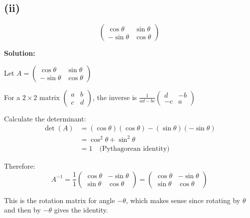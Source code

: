 \subsection*{(ii)}
\[
	\begin{pmatrix}
		\cos\theta  & \sin\theta \\
		-\sin\theta & \cos\theta
	\end{pmatrix}
\]

\textbf{Solution:}

Let $A = \begin{pmatrix}
		\cos\theta  & \sin\theta \\
		-\sin\theta & \cos\theta
	\end{pmatrix}$

For a $2 \times 2$ matrix $\begin{pmatrix} a & b \\ c & d \end{pmatrix}$, the inverse is $\frac{1}{ad-bc}\begin{pmatrix} d & -b \\ -c & a \end{pmatrix}$

Calculate the determinant:
\begin{align}
	\det(A) & = (\cos\theta)(\cos\theta) - (\sin\theta)(-\sin\theta) \\
	        & = \cos^2\theta + \sin^2\theta                          \\
	        & = 1 \quad \text{(Pythagorean identity)}
\end{align}

Therefore:
\[
	A^{-1} = \frac{1}{1}\begin{pmatrix}
		\cos\theta & -\sin\theta \\
		\sin\theta & \cos\theta
	\end{pmatrix} = \begin{pmatrix}
		\cos\theta & -\sin\theta \\
		\sin\theta & \cos\theta
	\end{pmatrix}
\]

This is the rotation matrix for angle $-\theta$, which makes sense since rotating by $\theta$ and then by $-\theta$ gives the identity.